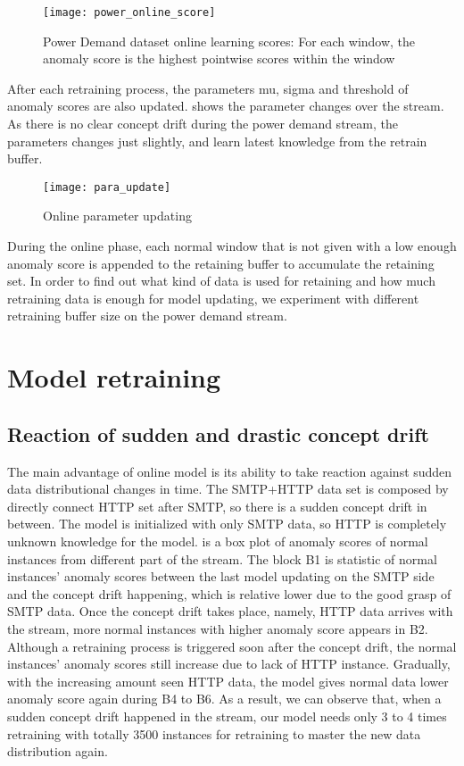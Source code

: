 \begin{figure}[h]
\centering
\texttt{[image: power\_online\_score]}
\caption[Power Demand dataset online learning scores]{Power Demand dataset online learning scores: For each window, the anomaly score is the highest pointwise scores within the window}
\label{fig:power_online}
\end{figure}

After each retraining process, the parameters mu, sigma and threshold of anomaly scores are also updated.  shows the parameter changes over the stream. As there is no clear concept drift during the power demand stream, the parameters changes just slightly, and learn latest knowledge from the retrain buffer. 

\begin{figure}[h]
\centering
\texttt{[image: para\_update]}
\caption[Online parameter updating]{Online parameter updating}
\label{fig:parachanges}
\end{figure}

During the online phase, each normal window that is not given with a low enough anomaly score is appended to the retaining buffer to accumulate the retaining set. In order to find out what kind of data is used for retaining and how much retraining data is enough for model updating, we experiment with different retraining buffer size on the power demand stream.




\section{Model retraining}
\label{sec:retraining}

\subsection{Reaction of sudden and drastic concept drift}
\label{sec:reaction}
The main advantage of online model is its ability to take reaction against sudden data distributional changes in time. The SMTP+HTTP data set is composed by directly connect HTTP set after SMTP, so there is a sudden concept drift in between. The model is initialized with only SMTP data, so HTTP is completely unknown knowledge for the model.  is a box plot of anomaly scores of normal instances from different part of the stream. The block B1 is  statistic of normal instances’ anomaly scores between the last model updating on the SMTP side and the concept drift happening, which is relative lower due to the good grasp of SMTP data. Once the concept drift takes place, namely, HTTP data arrives with the stream, more normal instances with higher anomaly score appears in B2. Although a retraining process is triggered soon after the concept drift, the normal instances’ anomaly scores still increase due to lack of HTTP instance. Gradually, with the increasing amount seen HTTP data, the model gives normal data lower anomaly score again during B4 to B6. As a result, we can observe that, when a sudden concept drift happened in the stream, our model needs only 3 to 4 times retraining with totally 3500 instances for retraining to master the new data distribution again.


